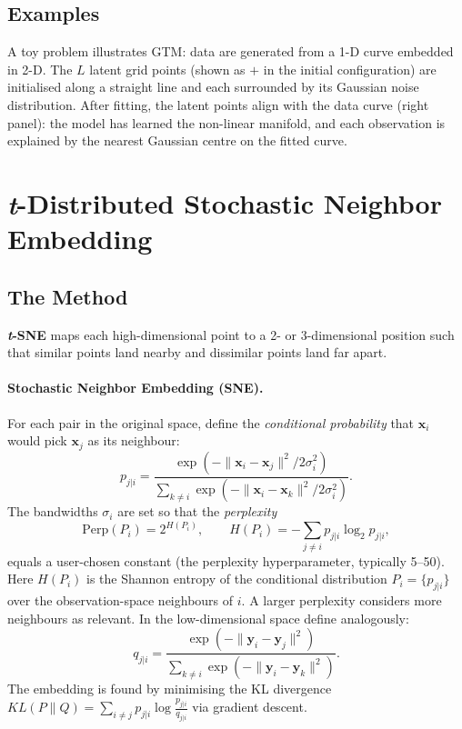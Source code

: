 \documentclass[11pt, oneside]{book}
\begin{document}
\subsection{Examples}

A toy problem illustrates GTM: data are generated from a 1-D curve
embedded in 2-D.
The $L$ latent grid points (shown as $+$ in the initial configuration) are
initialised along a straight line and each surrounded by its Gaussian noise
distribution.
After fitting, the latent points align with the data curve (right panel):
the model has learned the non-linear manifold, and each observation is
explained by the nearest Gaussian centre on the fitted curve.

\section{\textit{t}-Distributed Stochastic Neighbor Embedding}

\subsection{The Method}

\textbf{\textit{t}-SNE} maps each high-dimensional point to a 2- or
3-dimensional position such that similar points land nearby and dissimilar
points land far apart.

\paragraph{Stochastic Neighbor Embedding (SNE).}
For each pair in the original space, define the \emph{conditional probability}
that $\bm{x}_i$ would pick $\bm{x}_j$ as its neighbour:
\[
  p_{j|i} = \frac{\exp(-\|\bm{x}_i-\bm{x}_j\|^2/2\sigma_i^2)}
                 {\sum_{k\neq i}\exp(-\|\bm{x}_i-\bm{x}_k\|^2/2\sigma_i^2)}.
\]
The bandwidths $\sigma_i$ are set so that the \emph{perplexity}
\[
  \mathrm{Perp}(P_i) = 2^{H(P_i)}, \qquad
  H(P_i) = -\sum_{j\neq i} p_{j|i}\log_2 p_{j|i},
\]
equals a user-chosen constant (the perplexity hyperparameter, typically 5–50).
Here $H(P_i)$ is the Shannon entropy of the conditional distribution $P_i = \{p_{j|i}\}$
over the observation-space neighbours of $i$.
A larger perplexity considers more neighbours as relevant.
In the low-dimensional space define analogously:
\[
  q_{j|i} = \frac{\exp(-\|\bm{y}_i-\bm{y}_j\|^2)}
                 {\sum_{k\neq i}\exp(-\|\bm{y}_i-\bm{y}_k\|^2)}.
\]
The embedding is found by minimising the KL divergence
$KL(P\|Q)=\sum_{i\neq j}p_{j|i}\log\frac{p_{j|i}}{q_{j|i}}$
via gradient descent.
\end{document}
